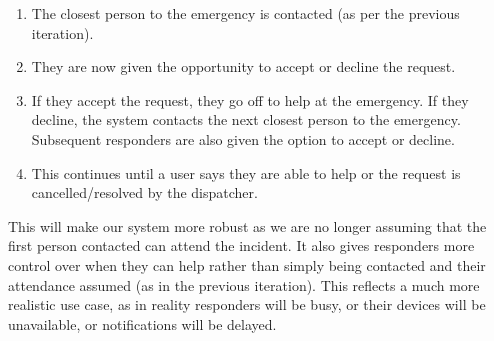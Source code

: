 \documentclass{article}
\begin{document}
	\begin{enumerate}
  		\item The closest person to the emergency is contacted (as per the previous iteration).
  		\item They are now given the opportunity to accept or decline the request.
  		\item If they accept the request, they go off to help at the emergency. If they decline, the system contacts the next closest person to the emergency. Subsequent responders are also given the option to accept or decline.
  		\item This continues until a user says they are able to help or the request is cancelled/resolved by the dispatcher.
	\end{enumerate}
	This will make our system more robust as we are no longer assuming that the first person contacted can attend the incident. It also gives responders more control over when they can help rather than simply being contacted and their attendance assumed (as in the previous iteration). This reflects a much more realistic use case, as in reality responders will be busy, or their devices will be unavailable, or notifications will be delayed.\\
		
\end{document}

